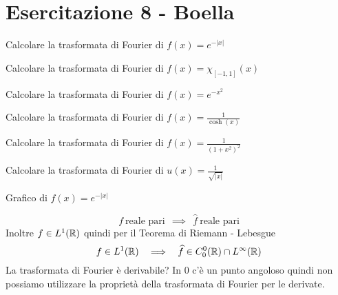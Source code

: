 \chapter{Esercitazione 8 - Boella}
\ParteEsercizi
\Esercizio{}

Calcolare la trasformata di Fourier di $f(x) = e^{ - |x|}$
\Esercizio{}

Calcolare la trasformata di Fourier di $f(x) = \chi _{[ - 1,1]} (x)$
\Esercizio{}

Calcolare la trasformata di Fourier di $f(x) = e^{ - x^{2}}$
\Esercizio{}

Calcolare la trasformata di Fourier di $f(x) = \frac{1}{\cosh (x)}$
\Esercizio{}

Calcolare la trasformata di Fourier di $f(x) = \frac{1}{\left(1 + x^{2}\right)^{2}}$
\Esercizio{}

Calcolare la trasformata di Fourier di $u(x) = \frac{1}{\sqrt{|x|}}$

\ParteSoluzioni
\Soluzione

Grafico di $f(x) = e^{ - | x| }$

\begin{equation*}
f\ \text{reale pari} \ \ \implies \ \ \hat{f} \ \text{reale pari}
\end{equation*}
Inoltre $f\in L^{1}(\mathbb{R})$ quindi per il Teorema di Riemann - Lebesgue
\begin{equation*}
f\in L^{1}(\mathbb{R}) \ \ \implies \ \ \widehat{f} \in C^{0}_{0}(\mathbb{R}) \cap L^{\infty }(\mathbb{R})
\end{equation*}
La trasformata di Fourier è derivabile? In $0$ c'è un punto angoloso quindi non possiamo utilizzare la proprietà della trasformata di Fourier per le derivate.

